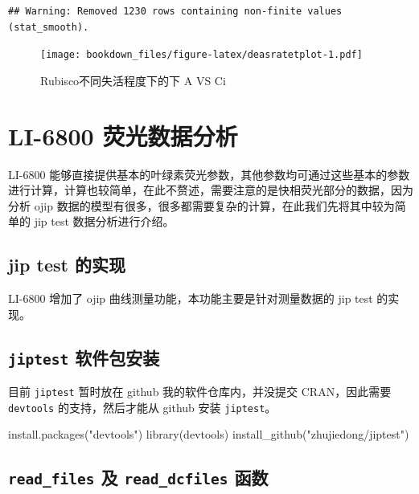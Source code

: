 \documentclass[
]{krantz}
\makeatletter
\newenvironment{Shaded}{\begin{snugshade}}{\end{snugshade}}
\newcommand{\FunctionTok}[1]{\textcolor[rgb]{0.00,0.00,0.00}{#1}}
\newcommand{\NormalTok}[1]{#1}
\newcommand{\StringTok}[1]{\textcolor[rgb]{0.31,0.60,0.02}{#1}}
\newenvironment{kframe}{%
\medskip{}
\setlength{\fboxsep}{.8em}
 \def\at@end@of@kframe{}%
 \ifinner\ifhmode%
  \def\at@end@of@kframe{\end{minipage}}%
  \begin{minipage}{\columnwidth}%
 \fi\fi%
 \def\FrameCommand##1{\hskip\@totalleftmargin \hskip-\fboxsep
 \colorbox{shadecolor}{##1}\hskip-\fboxsep
     \hskip-\linewidth \hskip-\@totalleftmargin \hskip\columnwidth}%
 \MakeFramed {\advance\hsize-\width
   \@totalleftmargin\z@ \linewidth\hsize
   \@setminipage}}%
 {\par\unskip\endMakeFramed%
 \at@end@of@kframe}
\renewenvironment{Shaded}{\begin{kframe}}{\end{kframe}}
\makeatother
\begin{document}
\begin{verbatim}
## Warning: Removed 1230 rows containing non-finite values (stat_smooth).
\end{verbatim}

\begin{figure}
\centering
\texttt{[image: bookdown\_files/figure-latex/deasratetplot-1.pdf]}
\caption{\label{fig:deasratetplot}Rubisco不同失活程度下的下 A VS Ci}
\end{figure}

\cleardoublepage

\hypertarget{fluro68}{%
\section{LI-6800 荧光数据分析}\label{fluro68}}

LI-6800 能够直接提供基本的叶绿素荧光参数，其他参数均可通过这些基本的参数进行计算，计算也较简单，在此不赘述，需要注意的是快相荧光部分的数据，因为分析 ojip 数据的模型有很多，很多都需要复杂的计算，在此我们先将其中较为简单的 jip test 数据分析进行介绍。

\hypertarget{jiptest}{%
\subsection{jip test 的实现}\label{jiptest}}

LI-6800 增加了 ojip 曲线测量功能，本功能主要是针对测量数据的 jip test 的实现。

\hypertarget{jiptest_pack}{%
\subsection{\texorpdfstring{\texttt{jiptest} 软件包安装}{jiptest 软件包安装}}\label{jiptest_pack}}

目前 \texttt{jiptest} 暂时放在 github 我的软件仓库内，并没提交 CRAN，因此需要 \texttt{devtools} 的支持，然后才能从 github 安装 \texttt{jiptest}。

\begin{Shaded}
\begin{Highlighting}[]
\FunctionTok{install.packages}\NormalTok{(}\StringTok{"devtools"}\NormalTok{)}
\FunctionTok{library}\NormalTok{(devtools)}
\FunctionTok{install\_github}\NormalTok{(}\StringTok{"zhujiedong/jiptest"}\NormalTok{)}
\end{Highlighting}
\end{Shaded}

\hypertarget{readfluor}{%
\subsection{\texorpdfstring{\texttt{read\_files} 及 \texttt{read\_dcfiles} 函数}{read\_files 及 read\_dcfiles 函数}}\label{readfluor}}
\end{document}
